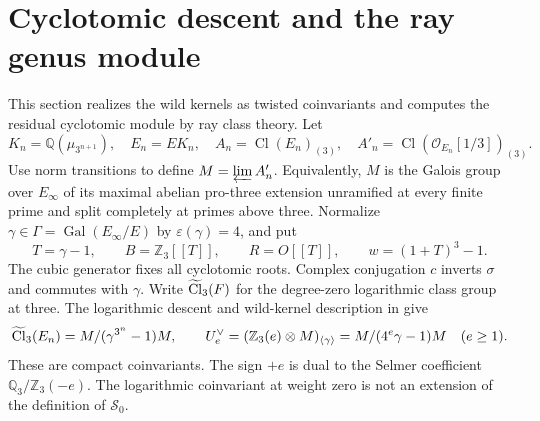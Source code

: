 \documentclass[11pt]{article}
\theoremstyle{remark}\newtheorem{remark}[theorem]{Remark}
\newcommand{\Z}{\mathbb Z}\newcommand{\Q}{\mathbb Q}\newcommand{\F}{\mathbb F}
\newcommand{\Oa}{\mathcal O}\newcommand{\Cl}{\operatorname{Cl}}
\newcommand{\Gal}{\operatorname{Gal}}\newcommand{\len}{\operatorname{length}}
\begin{document}
\section{Cyclotomic descent and the ray genus module}
This section realizes the wild kernels as twisted coinvariants and computes the residual cyclotomic module by ray class theory.
Let
\[
 K_n=\Q(\mu_{3^{n+1}}),\quad E_n=EK_n,\quad
 A_n=\Cl(E_n)_{(3)},\quad A'_n=\Cl(\Oa_{E_n}[1/3])_{(3)}.
\]
Use norm transitions to define $M=\varprojlim A'_n$.
Equivalently, $M$ is the Galois group over $E_\infty$ of its maximal abelian pro-three extension unramified at every finite prime and split completely at primes above three.
Normalize $\gamma\in\Gamma=\Gal(E_\infty/E)$ by $\varepsilon(\gamma)=4$, and put
\[
 T=\gamma-1,\qquad B=\Z_3[[T]],\qquad R=O[[T]],\qquad
 w=(1+T)^3-1.
\]
The cubic generator fixes all cyclotomic roots.
Complex conjugation $c$ inverts $\sigma$ and commutes with $\gamma$.
Write $\lc(F)$ for the degree-zero logarithmic class group at three.
The logarithmic descent and wild-kernel description in \citet[Definition 1, Proposition 2, and Theorem 3]{JaulentMichel2006} give
\begin{equation}
 \lc(E_n)=M/(\gamma^{3^n}-1)M,\qquad
 U_e^\vee=(\Z_3(e)\otimes M)_{\langle\gamma\rangle}
 =M/(4^e\gamma-1)M\quad(e\geq1).
 \label{eq:Schneider}
\end{equation}
These are compact coinvariants. The sign $+e$ is dual to the Selmer coefficient $\Q_3/\Z_3(-e)$.
The logarithmic coinvariant at weight zero is not an extension of the definition of $\mathcal S_0$.
\end{document}
